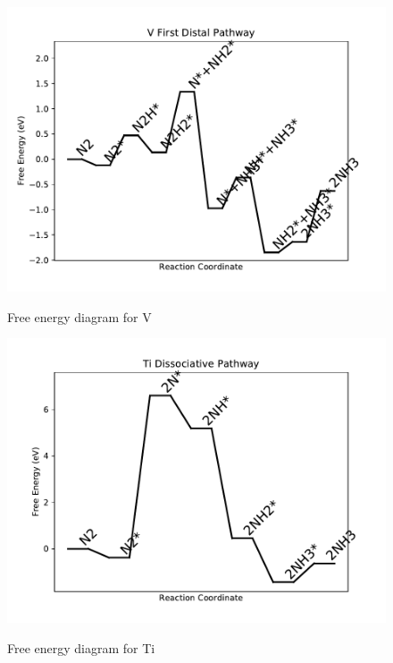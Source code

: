 \documentclass[journal=jacsat,manuscript=article]{achemso}
\begin{document}
\begin{figure}
\includegraphics[width=1\linewidth]{data/plots/V_distal_1.pdf}
\label{fig:V_distal_1}
\caption{Free energy diagram for V}
\end{figure}

\newpage
\begin{figure}
\includegraphics[width=1\linewidth]{data/plots/Ti_dissociative.pdf}
\label{fig:Ti_dissociative}
\caption{Free energy diagram for Ti}
\end{figure}
\end{document}
